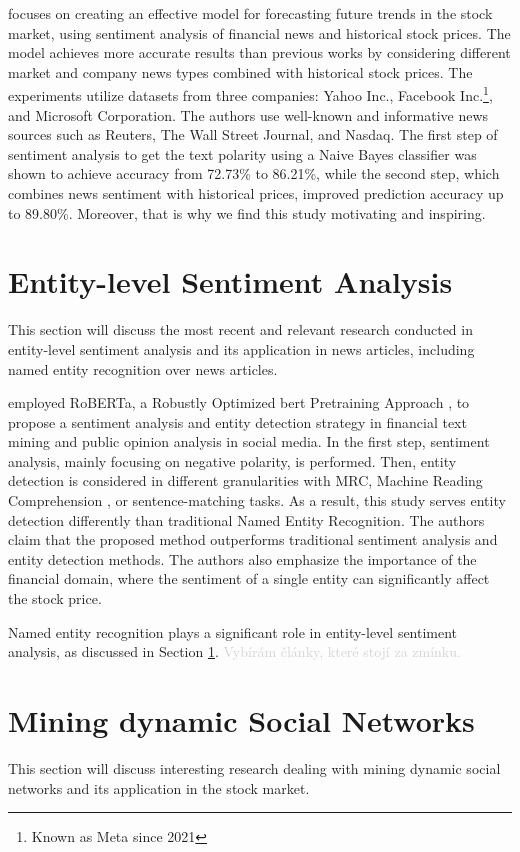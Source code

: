 \textcite{khedr2017predicting} focuses on creating an effective model for forecasting future trends in the stock market, using sentiment analysis of financial news and historical stock prices. The model achieves more accurate results than previous works by considering different market and company news types combined with historical stock prices. The experiments utilize datasets from three companies: Yahoo Inc., Facebook Inc.\footnote{Known as Meta since 2021}, and Microsoft Corporation. The authors use well-known and informative news sources such as Reuters, The Wall Street Journal, and Nasdaq. The first step of sentiment analysis to get the text polarity using a Naive Bayes classifier was shown to achieve accuracy from 72.73\% to 86.21\%, while the second step, which combines news sentiment with historical prices, improved prediction accuracy up to 89.80\%. Moreover, that is why we find this study motivating and inspiring.

\section{Entity-level Sentiment Analysis}
\label{sec:entity-level-sentiment-analysis}
This section will discuss the most recent and relevant research conducted in entity-level sentiment analysis and its application in news articles, including named entity recognition over news articles.

\cite{zhao2021bert} employed RoBERTa, a Robustly Optimized \acrshort{bert} Pretraining Approach \parencite{liu2019roberta}, to propose a sentiment analysis and entity detection strategy in financial text mining and public opinion analysis in social media. In the first step, sentiment analysis, mainly focusing on negative polarity, is performed. Then, entity detection is considered in different granularities with MRC, Machine Reading Comprehension \parencite{liu2019mrc}, or sentence-matching tasks. As a result, this study serves entity detection differently than traditional Named Entity Recognition. The authors claim that the proposed method outperforms traditional sentiment analysis and entity detection methods. The authors also emphasize the importance of the financial domain, where the sentiment of a single entity can significantly affect the stock price.

Named entity recognition plays a significant role in entity-level
sentiment analysis, as discussed in Section \ref{sec:entity-level-sentiment-analysis}. \textcolor{lightgray}{Vybírám články, které stojí za zmínku.}

\section{Mining dynamic Social Networks}
\label{sec:mining-dynamic-social-networks}
This section will discuss interesting research \cite{Jin2012} dealing with mining dynamic social networks and its application in the stock market. 

